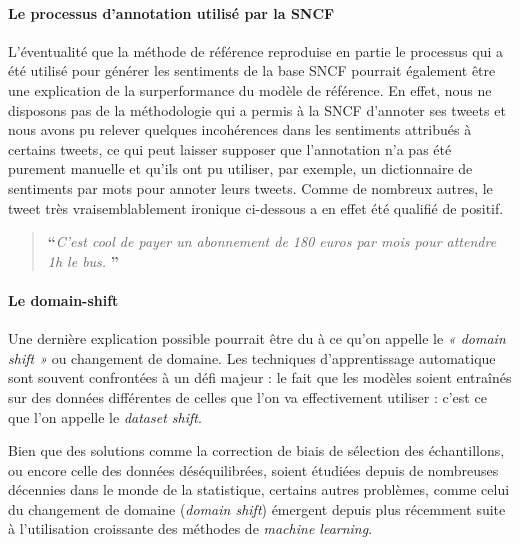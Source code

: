 \documentclass[11pt,french,french]{article}
\begin{document}
\hypertarget{le-processus-dannotation-utilisuxe9-par-la-sncf}{%
\paragraph{Le processus d'annotation utilisé par la SNCF}\label{le-processus-dannotation-utilisuxe9-par-la-sncf}}

L'éventualité que la méthode de référence reproduise en partie le processus qui a été utilisé pour générer les sentiments de la base SNCF pourrait également être une explication de la surperformance du modèle de référence.
En effet, nous ne disposons pas de la méthodologie qui a permis à la SNCF d'annoter ses tweets et nous avons pu relever quelques incohérences dans les sentiments attribués à certains tweets, ce qui peut laisser supposer que l'annotation n'a pas été purement manuelle et qu'ils ont pu utiliser, par exemple, un dictionnaire de sentiments par mots pour annoter leurs tweets.
Comme de nombreux autres, le tweet très vraisemblablement ironique ci-dessous a en effet été qualifié de positif.

\begin{quote}
\LARGE \textbf{``}\normalsize \emph{C'est cool de payer un abonnement de 180 euros par mois pour attendre 1h le bus.} \LARGE \textbf{''}\normalsize
\end{quote}

\hypertarget{le-domain-shift}{%
\paragraph{Le domain-shift}\label{le-domain-shift}}

Une dernière explication possible pourrait être du à ce qu'on appelle le \emph{« domain shift »} ou changement de domaine. Les techniques d'apprentissage automatique sont souvent confrontées à un défi majeur : le fait que les modèles soient entraînés sur des données différentes de celles que l'on va effectivement utiliser : c'est ce que l'on appelle le \emph{dataset shift}.

Bien que des solutions comme la correction de biais de sélection des échantillons, ou encore celle des données déséquilibrées, soient étudiées depuis de nombreuses décennies dans le monde de la statistique, certains autres problèmes, comme celui du changement de domaine (\emph{domain shift}) émergent depuis plus récemment suite à l'utilisation croissante des méthodes de \emph{machine learning}.
\end{document}
